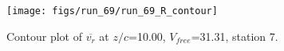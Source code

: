 \begin{figure}[H]
\centering
\texttt{[image: figs/run\_69/run\_69\_R\_contour]}
\caption{Contour plot of $\overline{v_{r}}$ at $z/c$=10.00, $V_{free}$=31.31, station 7.}
\label{fig:run_69_R_contour}
\end{figure}


